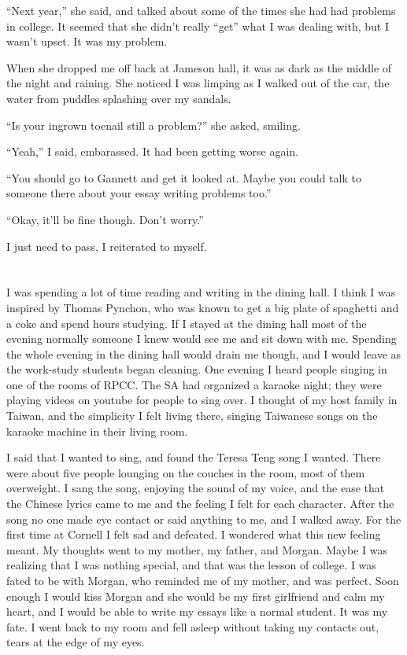 ``Next year,'' she said, and talked about some of the times she had had problems
in college.  It seemed that she didn't really ``get'' what I was dealing with,
but I wasn't upset.  It was my problem.

When she dropped me off back at Jameson hall, it was as dark as the middle of
the night and raining.  She noticed I was limping as I walked out of the car,
the water from puddles splashing over my sandals.

``Is your ingrown toenail still a problem?'' she asked, smiling.

``Yeah,'' I said, embarassed.  It had been getting worse again.  

``You should go to Gannett and get it looked at.  Maybe you could talk to
someone there about your essay writing problems too.''

``Okay, it'll be fine though.  Don't worry.''

I just need to pass, I reiterated to myself.

\section{}

I was spending a lot of time reading and writing in the dining hall.  I think I
was inspired by Thomas Pynchon, who was known to get a big plate of spaghetti
and a coke and spend hours studying.  If I stayed at the dining hall most of the
evening normally someone I knew would see me and sit down with me.  Spending the
whole evening in the dining hall would drain me though, and I would leave as the
work-study students began cleaning.  One evening I heard people singing in one
of the rooms of RPCC.  The SA had organized a karaoke night; they were playing
videos on youtube for people to sing over.  I thought of my host family in
Taiwan, and the simplicity I felt living there, singing Taiwanese songs on the
karaoke machine in their living room.  

I said that I wanted to sing, and found the Teresa Teng song I wanted.  There
were about five people lounging on the couches in the room, most of them
overweight.  I sang the song, enjoying the sound of my voice, and the ease that
the Chinese lyrics came to me and the feeling I felt for each character.  After
the song no one made eye contact or said anything to me, and I walked away.  For
the first time at Cornell I felt sad and defeated.  I wondered what this new
feeling meant.  My thoughts went to my mother, my father, and Morgan.  Maybe I
was realizing that I was nothing special, and that was the lesson of college.  I
was fated to be with Morgan, who reminded me of my mother, and was perfect.
Soon enough I would kiss Morgan and she would be my first girlfriend and calm my
heart, and I would be able to write my essays like a normal student.  It was my
fate.  I went back to my room and fell asleep without taking my contacts out,
tears at the edge of my eyes.

